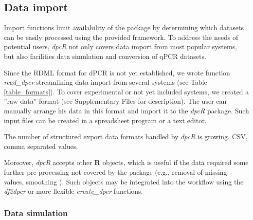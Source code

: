 \documentclass[a4,center,fleqn]{NAR}
\begin{document}
\subsection{Data import}

Import functions limit availability of the package by determining which datasets 
can be easily processed using the provided framework. To address the needs of 
potential users, \textit{dpcR} not only covers data import from most popular 
systems, but also facilities data simulation and conversion of qPCR datasets.

Since the RDML format for dPCR is not yet established, we wrote function 
\textit{read\_dpcr} streamlining data import from several systems (see Table 
\ref{table_formats}). To cover experimental or not yet included systems, we 
created a ''raw data'' format (see Supplementary Files for description). The 
user can manually arrange his data in this format and import it to the 
\textit{dpcR} package. Such input files can be created in a spreadsheet program 
or a text editor.

\begin{table}[b]
 {The number of structured export data formats handled by \textit{dpcR} is 
growing. CSV, comma separated values.}
\end{table}

Moreover, \textit{dpcR} accepts other \textbf{R} objects, which is useful if the 
data required some further pre-processing not covered by the package (e.g., 
removal of missing values, smoothing \cite{spiess_impact_2015}). Such objects 
may be integrated into the workflow using the \textit{df2dpcr} or more flexible 
\textit{create\_dpcr} functions.

\subsubsection{Data simulation}
\end{document}
